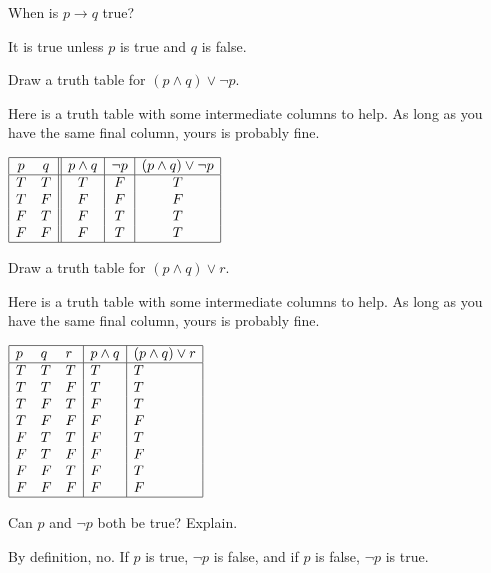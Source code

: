 \begin{requ}
When is $p\rightarrow q$ true?
\begin{requanswer}
It is true unless $p$ is true and $q$ is false.
\end{requanswer}
\end{requ}

\begin{requ}
Draw a truth table for $(p\wedge q)\vee\neg p$.
\begin{requanswer}
Here is a truth table with some intermediate columns to help. As long as you have the same final column, yours is probably fine.

$\begin{array}{|cc||c|c|c|} \hline p & q & p  \wedge q & \neg p&(p \wedge q) \vee\neg p \\
\hline
T & T & T & F&T\\
T & F & F & F&F \\
F & T & F & T&T \\
F & F & F & T&T\\
\hline
\end{array}$
\end{requanswer}
\end{requ}

\begin{requ}
Draw a truth table for $(p\wedge q)\vee r$.
\begin{requanswer}
Here is a truth table with some intermediate columns to help. As long as you have the same final column, yours is probably fine.

$\begin{array}{|lll|l|l|}
\hline
p & q & r & p\wedge q& (p\wedge q)\vee r\\
\hline
T & T & T & T &T\\
T & T & F & T &T\\
T & F & T & F &T\\
T & F & F & F &F\\
F & T & T & F &T\\
F & T & F & F &F\\
F & F & T & F &T\\
F & F & F & F &F\\
\hline
\end{array}$
\end{requanswer}
\end{requ}

\begin{requ}
Can $p$ and $\neg p$ both be true? Explain.
\begin{requanswer}
By definition, no. If $p$ is true, $\neg p$ is false, and if $p$ is false, $\neg p$ is true.
\end{requanswer}
\end{requ}

